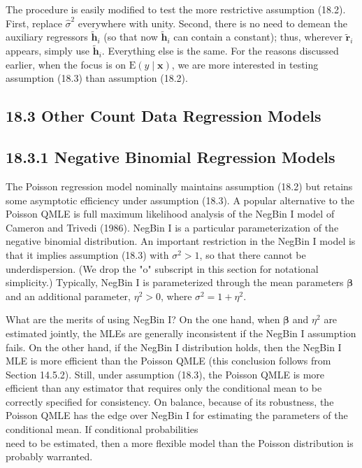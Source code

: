 \documentclass[10pt]{article}
\begin{document}
The procedure is easily modified to test the more restrictive assumption (18.2). First, replace $\hat{\sigma}^{2}$ everywhere with unity. Second, there is no need to demean the auxiliary regressors $\tilde{\mathbf{h}}_{i}$ (so that now $\tilde{\mathbf{h}}_{i}$ can contain a constant); thus, wherever $\tilde{\mathbf{r}}_{i}$ appears, simply use $\tilde{\mathbf{h}}_{i}$. Everything else is the same. For the reasons discussed earlier, when the focus is on $\mathrm{E}(y \mid \mathbf{x})$, we are more interested in testing assumption (18.3) than assumption (18.2).

\subsection*{18.3 Other Count Data Regression Models}
\subsection*{18.3.1 Negative Binomial Regression Models}
The Poisson regression model nominally maintains assumption (18.2) but retains some asymptotic efficiency under assumption (18.3). A popular alternative to the Poisson QMLE is full maximum likelihood analysis of the NegBin I model of Cameron and Trivedi (1986). NegBin I is a particular parameterization of the negative binomial distribution. An important restriction in the NegBin I model is that it implies assumption (18.3) with $\sigma^{2}>1$, so that there cannot be underdispersion. (We drop the "o" subscript in this section for notational simplicity.) Typically, NegBin I is parameterized through the mean parameters $\boldsymbol{\beta}$ and an additional parameter, $\eta^{2}>0$, where $\sigma^{2}=1+\eta^{2}$.

What are the merits of using NegBin I? On the one hand, when $\boldsymbol{\beta}$ and $\eta^{2}$ are estimated jointly, the MLEs are generally inconsistent if the NegBin I assumption fails. On the other hand, if the NegBin I distribution holds, then the NegBin I MLE is more efficient than the Poisson QMLE (this conclusion follows from Section 14.5.2). Still, under assumption (18.3), the Poisson QMLE is more efficient than any estimator that requires only the conditional mean to be correctly specified for consistency. On balance, because of its robustness, the Poisson QMLE has the edge over NegBin I for estimating the parameters of the conditional mean. If conditional probabilities\\
need to be estimated, then a more flexible model than the Poisson distribution is probably warranted.
\end{document}
